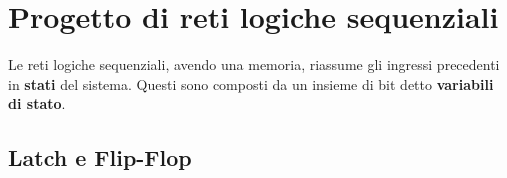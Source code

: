 \newpage
\section{Progetto di reti logiche sequenziali}
Le reti logiche sequenziali, avendo una memoria, riassume gli ingressi precedenti in \textbf{stati} del sistema. Questi sono composti da un insieme di bit detto \textbf{variabili di stato}.
\subsection{Latch e Flip-Flop}
